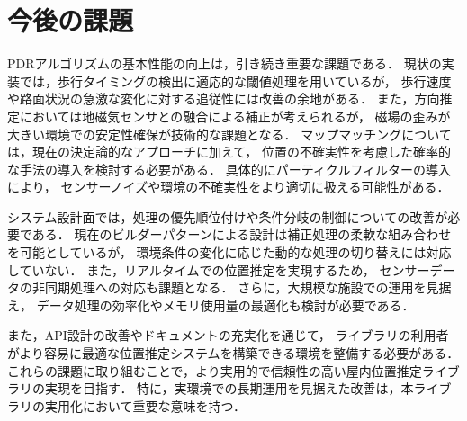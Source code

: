 \section{今後の課題}

PDRアルゴリズムの基本性能の向上は，引き続き重要な課題である．
現状の実装では，歩行タイミングの検出に適応的な閾値処理を用いているが，
歩行速度や路面状況の急激な変化に対する追従性には改善の余地がある．
また，方向推定においては地磁気センサとの融合による補正が考えられるが，
磁場の歪みが大きい環境での安定性確保が技術的な課題となる．
マップマッチングについては，現在の決定論的なアプローチに加えて，
位置の不確実性を考慮した確率的な手法の導入を検討する必要がある．
具体的にパーティクルフィルターの導入により，
センサーノイズや環境の不確実性をより適切に扱える可能性がある．

システム設計面では，処理の優先順位付けや条件分岐の制御についての改善が必要である．
現在のビルダーパターンによる設計は補正処理の柔軟な組み合わせを可能としているが，
環境条件の変化に応じた動的な処理の切り替えには対応していない．
また，リアルタイムでの位置推定を実現するため，
センサーデータの非同期処理への対応も課題となる．
さらに，大規模な施設での運用を見据え，
データ処理の効率化やメモリ使用量の最適化も検討が必要である．

また，API設計の改善やドキュメントの充実化を通じて，
ライブラリの利用者がより容易に最適な位置推定システムを構築できる環境を整備する必要がある．
これらの課題に取り組むことで，より実用的で信頼性の高い屋内位置推定ライブラリの実現を目指す．
特に，実環境での長期運用を見据えた改善は，本ライブラリの実用化において重要な意味を持つ．



